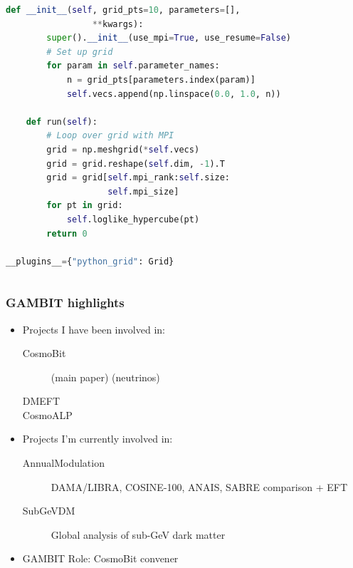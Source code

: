 \documentclass[aspectratio=169]{beamer}
\begin{document}
\begin{frame}[fragile]
\begin{columns}
\begin{lstlisting}[language=Python]
    def __init__(self, grid_pts=10, parameters=[],
                 **kwargs):
        super().__init__(use_mpi=True, use_resume=False)
        # Set up grid
        for param in self.parameter_names:
            n = grid_pts[parameters.index(param)]
            self.vecs.append(np.linspace(0.0, 1.0, n))
    
    def run(self):
        # Loop over grid with MPI
        grid = np.meshgrid(*self.vecs)
        grid = grid.reshape(self.dim, -1).T
        grid = grid[self.mpi_rank:self.size:
                    self.mpi_size]
        for pt in grid:
            self.loglike_hypercube(pt)
        return 0

__plugins__={"python_grid": Grid}
\end{lstlisting}
    \end{columns}
\end{frame}

\begin{frame}
    \frametitle{GAMBIT highlights}
    \begin{itemize}
        \item Projects I have been involved in:
            \begin{description}
                \item[CosmoBit] (main paper) (neutrinos)
                \item[DMEFT] 
                \item[CosmoALP] 
            \end{description}
        \item Projects I'm currently involved in:
            \begin{description}
                \item[AnnualModulation] DAMA/LIBRA, COSINE-100, ANAIS, SABRE comparison + EFT
                \item[SubGeVDM] Global analysis of sub-GeV dark matter
            \end{description}
        \item GAMBIT Role: CosmoBit convener
    \end{itemize}

\end{frame}

\end{document}
